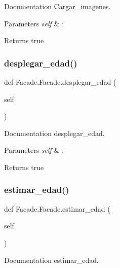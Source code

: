 Documentation Cargar\+\_\+imagenes. 


\begin{DoxyParams}{Parameters}
{\em self} & \+: \\
\hline
\end{DoxyParams}
\begin{DoxyReturn}{Returns}
true 
\end{DoxyReturn}
\mbox{\label{class_facade_1_1_facade_a92d3a050a1526997ed8d0c080c016b77}} 
\subsubsection{\texorpdfstring{desplegar\+\_\+edad()}{desplegar\_edad()}}
{\footnotesize\ttfamily def Facade.\+Facade.\+desplegar\+\_\+edad (\begin{DoxyParamCaption}\item[{}]{self }\end{DoxyParamCaption})}



Documentation desplegar\+\_\+edad. 


\begin{DoxyParams}{Parameters}
{\em self} & \+: \\
\hline
\end{DoxyParams}
\begin{DoxyReturn}{Returns}
true 
\end{DoxyReturn}
\mbox{\label{class_facade_1_1_facade_a31c82e317bb43cffa46140c2826a908b}} 
\subsubsection{\texorpdfstring{estimar\+\_\+edad()}{estimar\_edad()}}
{\footnotesize\ttfamily def Facade.\+Facade.\+estimar\+\_\+edad (\begin{DoxyParamCaption}\item[{}]{self }\end{DoxyParamCaption})}



Documentation estimar\+\_\+edad. 


